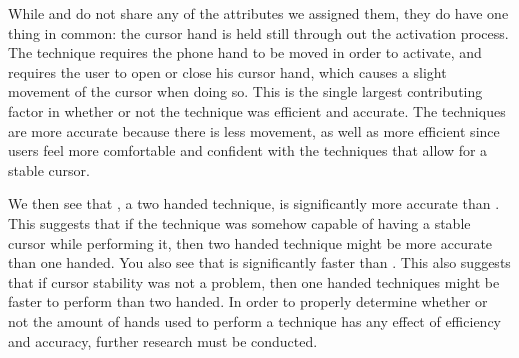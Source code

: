 While \swipe and \throw do not share any of the attributes we assigned them, they do have one thing in common: the cursor hand is held still through out the activation process.
The \tilt technique requires the phone hand to be moved in order to activate, and \grab requires the user to open or close his cursor hand, which causes a slight movement of the cursor when doing so.
This is the single largest contributing factor in whether or not the technique was efficient and accurate.
The techniques are more accurate because there is less movement, as well as more efficient since users feel more comfortable and confident with the techniques that allow for a stable cursor.

We then see that \grab, a two handed technique, is significantly more accurate than \tilt.
This suggests that if the technique was somehow capable of having a stable cursor while performing it, then two handed technique might be more accurate than one handed.
You also see that \tilt is significantly faster than \grab.
This also suggests that if cursor stability was not a problem, then one handed techniques might be faster to perform than two handed.
In order to properly determine whether or not the amount of hands used to perform a technique has any effect of efficiency and accuracy, further research must be conducted. 


